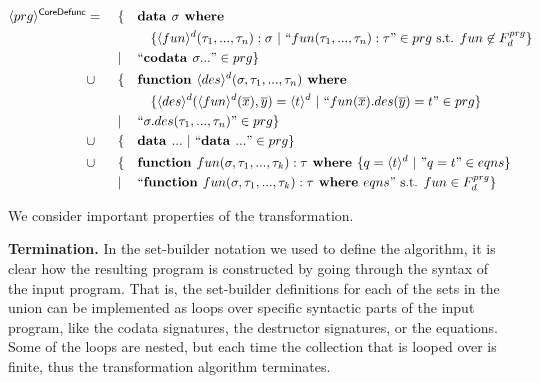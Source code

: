 \begin{algorithm}

\begin{align*}
\langle prg \rangle^{\textsf{CoreDefunc}} & = ~&& \{ && \textrm{\textbf{data }} \sigma \textrm{\textbf{ where }} \span\span\span\span \\
& && && && \{ \langle fun \rangle^d (\tau_1, ..., \tau_n): \sigma ~ | ~ `` fun(\tau_1, ..., \tau_n): \tau " \in prg \text{ s.t. } fun \not\in F^{prg}_d \} \\
& && | && `` \textrm{\textbf{codata }} \sigma ... " \in prg \} \span\span\span\span \\
& \cup && \{ && \textrm{\textbf{function }} \langle des \rangle^d (\sigma, \tau_1, ..., \tau_n) \textrm{\textbf{ where}} \span\span\span\span \\
& && && && \{ \langle des \rangle^d (\langle fun \rangle^d (\overline{x}), \overline{y}) = \langle t \rangle^d ~ | ~ `` fun(\overline{x}).des(\overline{y}) = t " \in prg \} \\
& && | && `` \sigma.des(\tau_1, ..., \tau_n) " \in prg \} \span\span\span\span \\
& \cup && \{ && \textrm{\textbf{data }} ... ~ | ~ `` \textrm{\textbf{data }} ... " \in prg \} \span\span\span\span \\
& \cup && \{ && \textrm{\textbf{function }} fun(\sigma, \tau_1, ..., \tau_k): \tau \textrm{\textbf{ where }} \{ q = \langle t \rangle^d ~ | ~ "q = t" \in eqns \} \span\span\span\span \\
& && | && `` \textrm{\textbf{function }} fun(\sigma, \tau_1, ..., \tau_k): \tau \textrm{\textbf{ where }} eqns " \text{ s.t. } fun \in F^{prg}_d \} \span\span\span\span
\end{align*}

\end{algorithm}

We consider important properties of the transformation.

\textbf{Termination.} In the set-builder notation we used to define the algorithm, it is clear how the resulting program is constructed by going through the syntax of the input program. That is, the set-builder definitions for each of the sets in the union can be implemented as loops over specific syntactic parts of the input program, like the codata signatures, the destructor signatures, or the equations. Some of the loops are nested, but each time the collection that is looped over is finite, thus the transformation algorithm terminates.

